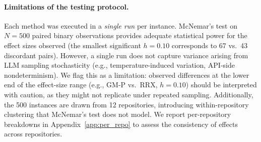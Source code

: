 \paragraph{Limitations of the testing protocol.} Each method was executed in a \emph{single run} per instance. McNemar's test on $N = 500$ paired binary observations provides adequate statistical power for the effect sizes observed (the smallest significant $h = 0.10$ corresponds to 67 vs.\ 43 discordant pairs). However, a single run does not capture variance arising from LLM sampling stochasticity (e.g., temperature-induced variation, API-side nondeterminism). We flag this as a limitation: observed differences at the lower end of the effect-size range (e.g., GM-P vs.\ RRX, $h = 0.10$) should be interpreted with caution, as they might not replicate under repeated sampling. Additionally, the 500 instances are drawn from 12 repositories, introducing within-repository clustering that McNemar's test does not model. We report per-repository breakdowns in Appendix~\ref{app:per_repo} to assess the consistency of effects across repositories.

